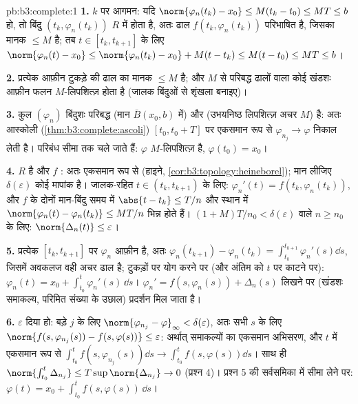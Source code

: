\begin{solution}{pb:b3:complete:1}
\textbf{1.} $k$ पर आगमन: यदि $\norm{\varphi_n(t_k) - x_0}
\leq M(t_k - t_0) \leq MT \leq b$ हो, तो बिंदु $(t_k,
\varphi_n(t_k))$ $R$ में
होता है, अतः ढाल $f(t_k,
\varphi_n(t_k))$ परिभाषित है, जिसका मानक $\leq M$ है; तब $t \in
[t_k, t_{k+1}]$
के लिए $\norm{\varphi_n(t) - x_0} \leq
\norm{\varphi_n(t_k) - x_0} + M(t - t_k) \leq M(t - t_0) \leq
MT \leq b$।

\textbf{2.} प्रत्येक आफ़ीन टुकड़े की ढाल का मानक $\leq M$ है; और $M$
से परिबद्ध ढालों वाला कोई खंडशः आफ़ीन फलन $M$-लिपशित्ज़ होता है
(जालक बिंदुओं से शृंखला बनाइए)।

\textbf{3.} कुल $(\varphi_n)$ बिंदुशः परिबद्ध (मान $\bar B(x_0, b)$ में) और 
(उभयनिष्ठ लिपशित्ज़ अचर $M$) है: अतः आस्कोली (\cref{thm:b3:complete:ascoli}) $[t_0, t_0 + T]$ पर
एकसमान रूप से $\varphi_{n_j} \to
\varphi$ निकाल लेती है। परिबंध सीमा तक चले जाते हैं:
$\varphi$ $M$-लिपशित्ज़ है, $\varphi(t_0) = x_0$।

\textbf{4.} $R$  है और $f$ : अतः एकसमान रूप से 
(हाइने, \cref{cor:b3:topology:heineborel}); मान लीजिए $\delta(\varepsilon)$ कोई मापांक है। जालक-रहित $t \in (t_k,
t_{k+1})$ के
लिए: $\varphi_n'(t) = f(t_k, \varphi_n(t_k))$, और $f$ के दोनों मान-बिंदु समय में $\abs{t - t_k} \leq T/n$ और स्थान में
$\norm{\varphi_n(t) - \varphi_n(t_k)} \leq MT/n$ भिन्न होते हैं। $(1 + M)T/n_0 < \delta(\varepsilon)$ वाले $n \geq n_0$ के लिए: $\norm{\Delta_n(t)} \leq \varepsilon$।

\textbf{5.} प्रत्येक $[t_k, t_{k+1}]$ पर $\varphi_n$ आफ़ीन है, अतः $\varphi_n(t_{k+1}) - \varphi_n(t_k) = \int_{t_k}^{t_{k+1}}
\varphi_n'(s)\dd s$, जिसमें अवकलज
वही अचर ढाल है; टुकड़ों पर योग करने पर (और अंतिम को $t$ पर काटने
पर): $\varphi_n(t) = x_0 + \int_{t_0}^t\varphi_n'(s)\,\dd s$। $\varphi_n' = f(s, \varphi_n(s)) + \Delta_n(s)$ लिखने पर (खंडशः  समाकल्य, परिमित संख्या के
उछाल) प्रदर्शन मिल जाता है।

\textbf{6.} $\varepsilon$ दिया हो: बड़े $j$ के लिए $\norm{\varphi_{n_j} - \varphi}_\infty < \delta(\varepsilon)$, अतः सभी $s$
के लिए $\norm{f(s, \varphi_{n_j}(s)) - f(s, \varphi(s))} \leq
\varepsilon$: अर्थात् समाकल्यों का एकसमान अभिसरण, और $t$ में
एकसमान रूप से $\int_{t_0}^t f(s,\varphi_{n_j}(s))\dd s \to
\int_{t_0}^tf(s, \varphi(s))\dd s$। साथ ही $\norm{\int_{t_0}^t\Delta_{n_j}} \leq T\sup\norm{\Delta_{n_j}}
\to 0$ (प्रश्न 4)। प्रश्न 5 की सर्वसमिका
में सीमा लेने पर: $\varphi(t) = x_0 + \int_{t_0}^tf(s,
\varphi(s))\,\dd s$।


\end{solution}
